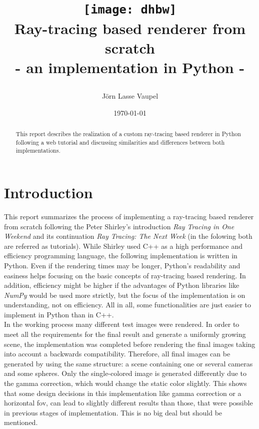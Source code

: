 \documentclass[]{article}
\title{\raggedright\texttt{[image: dhbw]}\\[2cm]
		\centering Ray-tracing based renderer from scratch\\- an implementation in Python -}
\author{Jörn Lasse Vaupel}
\date{\today}
\begin{document}
	
	\maketitle
	\vfill
	\begin{abstract}
		\noindent
		This report describes the realization of a custom ray-tracing based renderer in Python following a web tutorial and discussing similarities and differences between both implementations.
	\end{abstract}

	\newpage
	\tableofcontents
	\newpage
	
	\section{Introduction}
	\label{sec:intro}
	This report summarizes the process of implementing a ray-tracing based renderer from scratch following the Peter Shirley’s introduction \emph{Ray Tracing in One Weekend}  \cite{Shirley2020RTW1} and its continuation \emph{Ray Tracing: The Next Week} \cite{Shirley2020RTW2} (in the folowing both are referred as tutorials). While Shirley used C++ as a high performance and efficiency programming language, the following implementation is written in Python.  Even if the rendering times may be longer, Python’s readability and easiness helps focusing on the basic concepts of ray-tracing based rendering. In addition, efficiency might be higher if the advantages of Python libraries like \emph{NumPy} would be used more strictly, but the focus of the implementation is on understanding, not on efficiency. All in all, some functionalities are just easier to implement in Python than in C++.
	\\
	In the working process many different test images were rendered. In order to meet all the requirements for the final result and generate a uniformly growing scene, the implementation was completed before rendering the final images taking into account a backwards compatibility. Therefore, all final images can be generated by using the same structure: a scene containing one or several cameras and some spheres. Only the single-colored image is generated differently due to the gamma correction, which would change the static color slightly. This shows that some design decisions in this implementation like gamma correction or a horizontal \ac{fov}, can lead to slightly different results than those, that were possible in previous stages of implementation. This is no big deal but should be mentioned.
	
\end{document}
